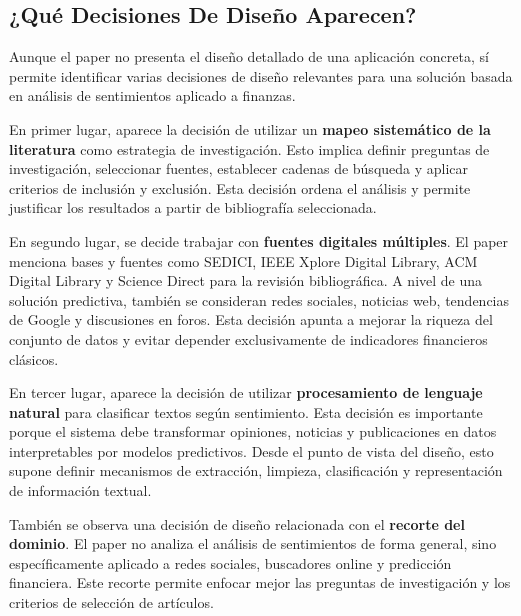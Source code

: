 \subsection{¿Qué Decisiones De Diseño Aparecen?}
\vspace{2mm}

Aunque el paper no presenta el diseño detallado de una aplicación concreta, sí permite identificar varias decisiones de diseño relevantes para una solución basada en análisis de sentimientos aplicado a finanzas.

\vspace{2mm}

En primer lugar, aparece la decisión de utilizar un \textbf{mapeo sistemático de la literatura} como estrategia de investigación. Esto implica definir preguntas de investigación, seleccionar fuentes, establecer cadenas de búsqueda y aplicar criterios de inclusión y exclusión. Esta decisión ordena el análisis y permite justificar los resultados a partir de bibliografía seleccionada.

\vspace{2mm}

En segundo lugar, se decide trabajar con \textbf{fuentes digitales múltiples}. El paper menciona bases y fuentes como SEDICI, IEEE Xplore Digital Library, ACM Digital Library y Science Direct para la revisión bibliográfica. A nivel de una solución predictiva, también se consideran redes sociales, noticias web, tendencias de Google y discusiones en foros. Esta decisión apunta a mejorar la riqueza del conjunto de datos y evitar depender exclusivamente de indicadores financieros clásicos.

\vspace{2mm}

En tercer lugar, aparece la decisión de utilizar \textbf{procesamiento de lenguaje natural} para clasificar textos según sentimiento. Esta decisión es importante porque el sistema debe transformar opiniones, noticias y publicaciones en datos interpretables por modelos predictivos. Desde el punto de vista del diseño, esto supone definir mecanismos de extracción, limpieza, clasificación y representación de información textual.

\vspace{2mm}

También se observa una decisión de diseño relacionada con el \textbf{recorte del dominio}. El paper no analiza el análisis de sentimientos de forma general, sino específicamente aplicado a redes sociales, buscadores online y predicción financiera. Este recorte permite enfocar mejor las preguntas de investigación y los criterios de selección de artículos.

